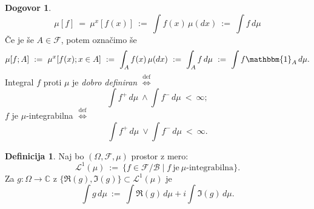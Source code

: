 \documentclass[11pt]{article}
\newcommand{\B}{\mathcal{B}}
\newcommand{\F}{\mathcal{F}}
\renewcommand{\L}{\mathcal{L}}
\newcommand{\diff}{\overset{\text{def}}{\iff}}
\newcommand{\set}[1]{\{#1\}}
\newcommand{\1}{\mathbbm{1}}
\theoremstyle{definition}
\newtheorem{definicija}{Definicija}[section]
\theoremstyle{definition}
\theoremstyle{definition}
\theoremstyle{definition}
\newtheorem*{dogovor}{Dogovor}
\begin{document}
\begin{dogovor}

$$\mu[f] ~=~ \mu^x[f(x)] ~:=~ \int f(x)\,\mu(dx) ~:=~ \int f\,d\mu$$
Če je še $A \in \F$, potem označimo še
$$\mu[f; A] ~:=~ \mu^x[f(x); x \in A] ~:=~ \int_A f(x)\,\mu(dx) ~:=~ \int_A f\,d\mu ~:=~ \int f\1_A\,d\mu.$$
Integral $f$ proti $\mu$ je \textit{dobro definiran} $\diff$
$$\int f^+\,d\mu ~\wedge \int f^-\,d\mu ~<~ \infty;$$
$f$ je $\mu$-integrabilna $\diff$
$$\int f^+\,d\mu ~\vee \int f^-\,d\mu ~<~ \infty.$$

\end{dogovor}
\vspace{0.5cm}

\begin{definicija}

Naj bo $(\Omega, \F, \mu)$ prostor z mero:
$$\L^1(\mu) ~:=~ \set{f \in \F/\B \mid f ~\text{je}~ \mu\text{-integrabilna}}.$$
Za $g: \Omega \rightarrow \mathbb{C}$ z $\set{\mathfrak{R}(g), \mathfrak{I}(g)} \subset \L^1(\mu)$ je
$$\int g\,d\mu ~:=~ \int \mathfrak{R}(g)\,d\mu + i\int \mathfrak{I}(g)\,d\mu.$$

\end{definicija}
\vspace{0.5cm}


\end{document}
